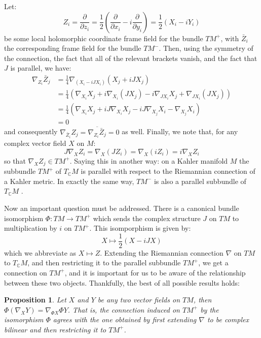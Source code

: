 \documentclass[11pt]{amsart}
\newtheorem{prop}[subsection]{Proposition}
\theoremstyle{definition}
\def \C{ \mathbb{C} }
\def \del{ \partial }
\begin{document}
Let:
%
$$ Z_i = \frac{ \del }{ \del z_i } = \frac{1}{2} \left( \frac{ \del }{ \del x_i } - i \frac{ \del }{ \del y_i } \right) = \frac{1}{2}\left( X_i - i Y_i \right) $$
%
be some local holomorphic coordinate frame field for the bundle $TM^{+}$, with $\bar{Z}_i$ the corresponding frame field for the bundle $TM^{-}$.
Then, using the symmetry of the connection, the fact that all of the relevant brackets vanish, and the fact that $J$ is parallel, we have:
%
\begin{align*}
\nabla_{Z_i} \bar{Z}_j &= \frac{1}{4} \nabla_{(X_i - i J X_i)} (X_j + i J X_j ) \\
&= \frac{1}{4} ( \nabla_{X_i} X_j + i \nabla_{X_i} (J X_j) - i \nabla_{J X_i} X_j + \nabla_{J X_i} ( J X_j ) )\\
&= \frac{1}{4} ( \nabla_{X_i} X_j + i J \nabla_{X_i} X_j - i J \nabla_{X_j} X_i - \nabla_{X_j} X_i ) \\
&= 0
\end{align*}
%
and consequently $\nabla_{\bar{Z}_i} Z_j = \overline{ \nabla_{Z_i} \bar{Z}_j } = 0$ as well.  Finally, we note that, for any complex vector field $X$ on $M$:
%
$$ J \nabla_{X} Z_i = \nabla_{X}(J Z_i) = \nabla_{X}( iZ_i ) = i \nabla_{X} Z_i $$
%
so that $\nabla_{X} Z_j \in TM^{+}$.  Saying this in another way: on a Kahler manifold $M$ the subbundle $TM^{+}$ of $T_{\C} M$ is parallel with respect to the Riemannian connection of a Kahler metric.  In exactly the same way, $TM^{-}$ is also a parallel subbundle of $T_{\C}M$ .

Now an important question must be addressed.  There is a canonical bundle isomorphism $\Phi: TM \rightarrow TM^{+}$ which sends the complex structure $J$ on $TM$ to multiplication by $i$ on $TM^{+}$.  This isomporphism is given by:
%
$$ X \mapsto \frac{1}{2}( X - i JX )$$
%
which we abbreviate as $X \mapsto Z$. Extending the Riemannian connection $\nabla$ on $TM$ to $T_{\C}M$, and then restricting it to the parallel subbundle $TM^{+}$, we get a connection on $TM^{+}$, and it is important for us to be aware of the relationship between these two objects.  Thankfully, the best of all possible results holds:

\begin{prop} Let $X$ and $Y$ be any two vector fields on $TM$, then $\Phi( \nabla_X Y ) = \nabla_{ \Phi X } \Phi Y$.  That is, the connection induced on $TM^{+}$ by the isomorphism $\Phi$ agrees with the one obtained by first extending $\nabla$ to be complex bilinear and then restricting it to $TM^{+}$.
\end{prop}
\end{document}
